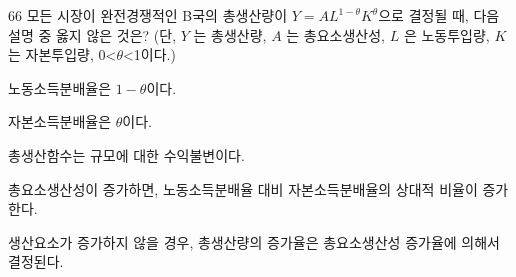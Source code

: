 \begin{question}{66}
모든 시장이 완전경쟁적인 B국의 총생산량이 $Y=AL^{ 1- \theta } K^{ \theta }$으로 결정될 때, 다음 설명 중 옳지 않은 것은? (단, $Y$ 는 총생산량, $A$ 는 총요소생산성, $L$ 은 노동투입량, $K$ 는 자본투입량, 0<$\theta$<1이다.)
\begin{choices}
  \item 노동소득분배율은 $1- \theta$이다.
  \item 자본소득분배율은 $\theta$이다.
  \item 총생산함수는 규모에 대한 수익불변이다.
  \item 총요소생산성이 증가하면, 노동소득분배율 대비 자본소득분배율의 상대적 비율이 증가한다.
  \item 생산요소가 증가하지 않을 경우, 총생산량의 증가율은 총요소생산성 증가율에 의해서 결정된다.
\end{choices}
\end{question}
